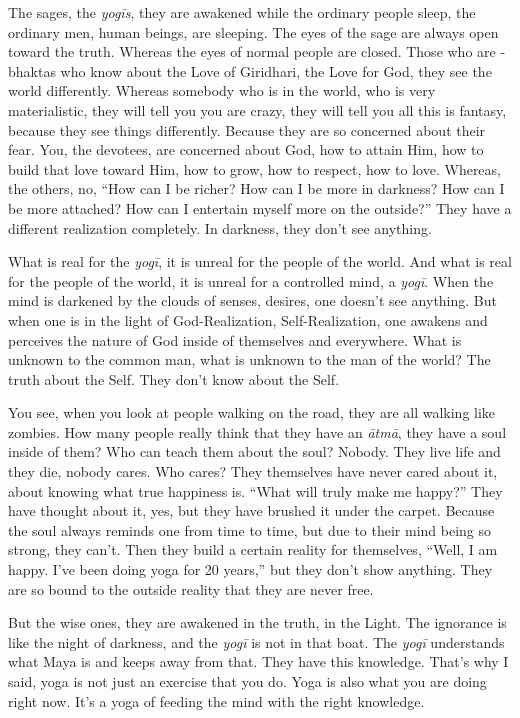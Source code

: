 The sages, the \textit{yogīs}, they are awakened while the ordinary people sleep, the ordinary men, human beings, are sleeping. The eyes of the sage are always open toward the truth. Whereas the eyes of normal people are closed. Those who are - bhaktas who know about the Love of Giridhari, the Love for God, they see the world differently. Whereas somebody who is in the world, who is very materialistic, they will tell you you are crazy, they will tell you all this is fantasy, because they see things differently. Because they are so concerned about their fear. You, the devotees, are concerned about God, how to attain Him, how to build that love toward Him, how to grow, how to respect, how to love. Whereas, the others, no, “How can I be richer? How can I be more in darkness? How can I be more attached? How can I entertain myself more on the outside?” They have a different realization completely. In darkness, they don’t see anything.

What is real for the \textit{yogī}, it is unreal for the people of the world. And what is real for the people of the world, it is unreal for a controlled mind, a \textit{yogī}. When the mind is darkened by the clouds of senses, desires, one doesn’t see anything. But when one is in the light of God-Realization, Self-Realization, one awakens and perceives the nature of God inside of themselves and everywhere. What is unknown to the common man, what is unknown to the man of the world? The truth about the Self. They don’t know about the Self.

You see, when you look at people walking on the road, they are all walking like zombies. How many people really think that they have an \textit{ātmā}, they have a soul inside of them? Who can teach them about the soul? Nobody. They live life and they die, nobody cares. Who cares? They themselves have never cared about it, about knowing what true happiness is. “What will truly make me happy?” They have thought about it, yes, but they have brushed it under the carpet. Because the soul always reminds one from time to time, but due to their mind being so strong, they can’t. Then they build a certain reality for themselves, “Well, I am happy. I’ve been doing yoga for 20 years,” but they don’t show anything. They are so bound to the outside reality that they are never free.

But the wise ones, they are awakened in the truth, in the Light. The ignorance is like the night of darkness, and the \textit{yogī} is not in that boat. The \textit{yogī} understands what Maya  is and keeps away from that. They have this knowledge. That’s why I said, yoga is not just an exercise that you do. Yoga is also what you are doing right now. It’s a yoga of feeding the mind with the right knowledge.

